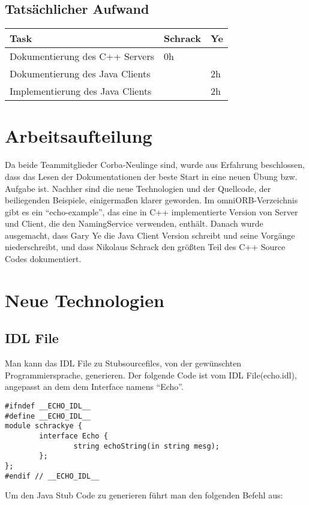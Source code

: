 \documentclass[11pt]{article}
\begin{document}
\subsection{Tatsächlicher Aufwand}
\begin{center}
  \begin{tabular}{| l | l | l |}
    \hline
    Task & Schrack & Ye \\ \hline

    Dokumentierung des C++ Servers   & 0h & \\ \hline
    Dokumentierung des Java Clients  &  & 2h\\ \hline
    Implementierung des Java Clients & & 2h \\ \hline
  \end{tabular}
\end{center}

\section{Arbeitsaufteilung}
Da beide Teammitglieder Corba-Neulinge sind, wurde aus Erfahrung beschlossen, dass das Lesen der Dokumentationen der beste Start in eine neuen Übung bzw. Aufgabe ist. Nachher sind die neue Technologien und der Quellcode, der beiliegenden Beispiele, einigermaßen klarer geworden. Im omniORB-Verzeichnis gibt es ein ``echo-example'', das eine in C++ implementierte Version von Server und Client, die den NamingService verwenden, enthält. Danach wurde ausgemacht, dass Gary Ye die Java Client Version schreibt und seine Vorgänge niederschreibt, und dass Nikolaus Schrack den größten Teil des C++ Source Codes dokumentiert. 

\section{Neue Technologien}

\subsection{IDL File}

Man kann das IDL File zu Stubsourcefiles, von der gewünschten Programmiersprache, generieren. Der folgende Code ist vom IDL File(echo.idl), angepasst an dem dem Interface namens ``Echo''.


\lstset{language=IDL}  
\begin{lstlisting}[frame=single]
#ifndef __ECHO_IDL__
#define __ECHO_IDL__
module schrackye {
        interface Echo {
                string echoString(in string mesg);
        };
};
#endif // __ECHO_IDL__         
\end{lstlisting}
Um den Java Stub Code zu generieren führt man den folgenden Befehl aus:
\end{document}
